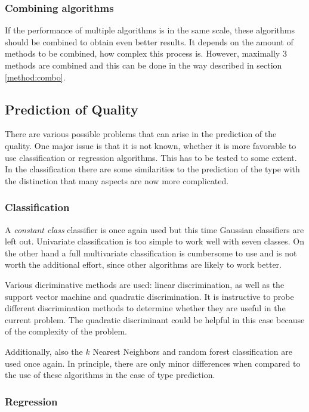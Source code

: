 \documentclass[twoside]{article}
\begin{document}
\begin{multicols}{2}
\subsubsection{Combining algorithms}

If the performance of multiple algorithms is in the same scale, these algorithms should be combined to obtain even better results. It depends on the amount
of methods to be combined, how complex this process is. However, maximally 3 methods are combined and this can be done in the way described in section \ref{method:combo}.

\subsection{Prediction of Quality}

There are various possible problems that can arise in the prediction of the quality. One major issue is that it is
not known, whether it is more favorable to use classification or regression algorithms. This has to be tested
to some extent. In the classification there are some similarities to the 
prediction of the type with the distinction that many aspects are now more complicated.

\subsubsection{Classification}

A \emph{constant class} classifier is once again used but this time Gaussian classifiers are left out. 
Univariate classification is too simple to work well with seven classes.
On the other hand a full multivariate classification is cumbersome to use and is not worth the 
additional effort, since other algorithms are likely to work better.

Various dicriminative methods are used: linear discrimination, as well as the support vector machine and quadratic discrimination. 
It is instructive to probe different discrimination methods to determine whether they are useful in the current problem. 
The quadratic discriminant could be helpful in this case because of the complexity of the problem.

Additionally, also the $k$ Nearest Neighbors and random forest classification are used once again. In principle, there are only minor
differences when compared to the use of these algorithms in the case of type prediction.

\subsubsection{Regression}


\end{multicols}
\end{document}
